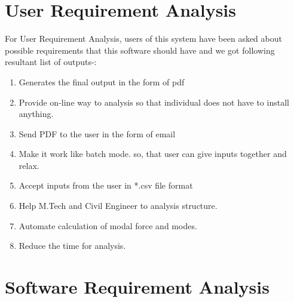 \section{User Requirement Analysis} 

For User Requirement Analysis, users of this system have been asked about 
possible requirements that this software should have and we got following
resultant list of outputs-:
\begin{enumerate}
\item Generates the final output in the form of pdf
\item Provide on-line way to analysis so that individual does not have to 
install anything.
\item Send PDF to the user in the form of email
\item Make it work like batch mode. so, that user can give inputs 
together and relax.
\item Accept inputs from the user in *.csv file format
\item Help M.Tech and Civil Engineer to analysis structure.
\item Automate calculation of modal force and modes.
\item Reduce the time for analysis.
\end{enumerate}

\section{Software Requirement Analysis}

